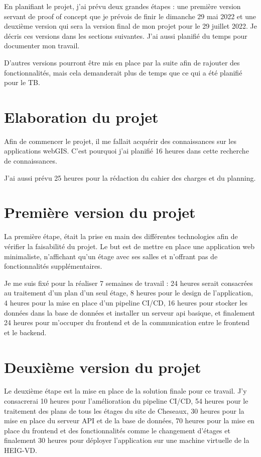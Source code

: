 \documentclass[
    iai, %
    il, %
]{heig-tb}
\begin{document}
En planifiant le projet, j'ai prévu deux grandes étapes :
une première version servant de proof of concept que je prévois de finir le dimanche 29 mai 2022
et une deuxième version qui sera la version final de mon projet pour le 29 juillet 2022.
Je décris ces versions dans les sections suivantes.
J'ai aussi planifié du temps pour documenter mon travail.

D'autres versions pourront être mis en place par la suite afin de rajouter des fonctionnalités,
mais cela demanderait plus de temps que ce qui a été planifié pour le TB.

\section{Elaboration du projet}
Afin de commencer le projet, il me fallait acquérir des connaissances sur les applications webGIS.
C'est pourquoi j'ai planifié 16 heures dans cette recherche de connaissances.

J'ai aussi prévu 25 heures pour la rédaction du cahier des charges et du planning.

\section{Première version du projet}
La première étape, était la prise en main des différentes technologies afin de vérifier la faisabilité du projet.
Le but est de mettre en place une application web minimaliste, n'affichant qu'un étage avec ses salles et n'offrant pas de fonctionnalités supplémentaires.

Je me suis fixé pour la réaliser 7 semaines de travail :
24 heures serait consacrées au traitement d'un plan d'un seul étage,
8 heures pour le design de l'application,
4 heures pour la mise en place d'un pipeline CI/CD,
16 heures pour stocker les données dans la base de données et installer un serveur api basique,
et finalement 24 heures pour m'occuper du frontend et de la communication entre le frontend et le backend.

\section{Deuxième version du projet}
Le deuxième étape est la mise en place de la solution finale pour ce travail.
J'y consacrerai 10 heures pour l'amélioration du pipeline CI/CD,
54 heures pour le traitement des plans de tous les étages du site de Cheseaux,
30 heures pour la mise en place du serveur API et de la base de données,
70 heures pour la mise en place du frontend et des fonctionnalités comme le changement d'étages
et finalement 30 heures pour déployer l'application sur une machine virtuelle de la HEIG-VD.
\end{document}
